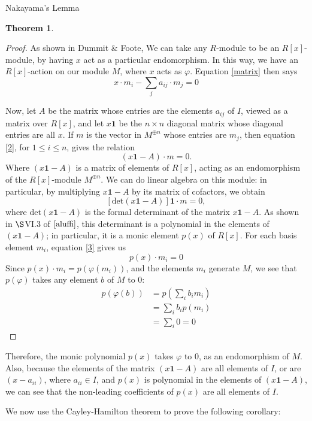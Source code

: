\documentclass[12pt]{article}
\theoremstyle{definition}
\newtheorem{theorem}[definition]{Theorem}
\begin{document}
\begin{section}{Nakayama's Lemma}
\begin{theorem}
\begin{proof}
			\par As shown in Dummit $\&$ Foote, We can take any $R$-module to be an $R[x]$-module, by having $x$ act as a particular endomorphism. In this way, we have an $R[x]$-action on our module $M$, where $x$ acts as $\varphi$. Equation \ref{matrix} then says
			\begin{equation} x \cdot m_i - \sum_j a_{ij}\cdot m_j = 0\label{2}\end{equation}
			\par Now, let $A$ be the matrix whose entries are the elements $a_{ij}$ of $I$, viewed as a matrix over $R[x]$, and let $x\mathbf{1}$ be the $n\times n$ diagonal matrix whose diagonal entries are all $x$. If $m$ is the vector in $M^{\oplus n}$ whose entries are $m_j$, then equation \ref{2}, for $1 \leq i \leq n$, gives the relation
			\[(x\mathbf 1 - A) \cdot m = 0.\]
			Where $(x \mathbf 1 - A)$ is a matrix of elements of $R[x]$, acting as an endomorphism of the $R[x]$-module $M^{\oplus n}$. We can do linear algebra on this module: in particular, by multiplying $x\mathbf 1 - A$ by its matrix of cofactors, we obtain 
			\begin{equation}\label{3} [\text{det}(x\mathbf 1 - A)]\mathbf 1 \cdot m = 0,\end{equation}
			where $\text{det}(x \mathbf 1 - A)$ is the formal determinant of the matrix $x \mathbf 1 - A$. As shown in $\S$VI.3 of $\cite{aluffi}$, this determinant is a polynomial in the elements of $(x \mathbf 1 - A)$; in particular, it is a monic element $p(x)$ of $R[x]$. For each basis element $m_i$, equation \ref{3} gives us
			\[ p(x) \cdot m_i = 0\]
			Since $p(x) \cdot m_i = p(\varphi(m_i))$, and the elements $m_i$ generate $M$, we see that $p(\varphi)$ takes any element $b$ of $M$ to $0$:
			\begin{align*}p(\varphi(b)) &= p\left( \sum_i b_i m_i \right)\\
			&= \sum_i b_i p(m_i)\\
		&= \sum_i 0 = 0\end{align*}
		\end{proof}
		Therefore, the monic polynomial $p(x)$ takes $\varphi$ to $0$, as an endomorphism of $M$. Also, because the elements of the matrix $(x\mathbf 1 - A)$ are all elements of $I$, or are $(x - a_{ii})$, where $a_{ii} \in I$, and $p(x)$ is polynomial in the elements of $(x \mathbf 1 - A)$, we can see that the non-leading coefficients of $p(x)$ are all elements of $I$.
	\end{theorem}
	We now use the Cayley-Hamilton theorem to prove the following corollary:

\end{section}
\end{document}

